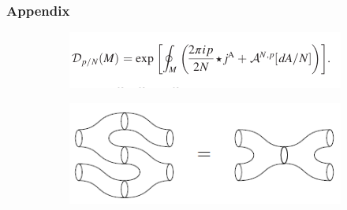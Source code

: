 \documentclass[10pt]{beamer}
\begin{document}
\begin{frame}
  \frametitle{Appendix}

  \begin{figure}
    \begin{subfigure}{0.5\textwidth}
      \centering
      \includegraphics[width=\linewidth]{operator.png}
    \end{subfigure}%
    \begin{subfigure}{0.5\textwidth}
      \centering
      \includegraphics[scale=0.5]{tqft.png}
    \end{subfigure}
  \end{figure}
\end{frame}
\end{document}
